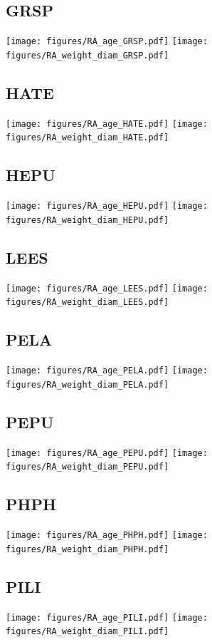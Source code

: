 \documentclass[10pt]{book} %
\begin{document}
\clearpage
\newpage
\subsection{GRSP}
\texttt{[image: figures/RA\_age\_GRSP.pdf]}
\texttt{[image: figures/RA\_weight\_diam\_GRSP.pdf]}

\clearpage
\newpage
\subsection{HATE}
\texttt{[image: figures/RA\_age\_HATE.pdf]}
\texttt{[image: figures/RA\_weight\_diam\_HATE.pdf]}

\clearpage
\newpage
\subsection{HEPU}
\texttt{[image: figures/RA\_age\_HEPU.pdf]}
\texttt{[image: figures/RA\_weight\_diam\_HEPU.pdf]}

\clearpage
\newpage
\subsection{LEES}
\texttt{[image: figures/RA\_age\_LEES.pdf]}
\texttt{[image: figures/RA\_weight\_diam\_LEES.pdf]}

\clearpage
\newpage
\subsection{PELA}
\texttt{[image: figures/RA\_age\_PELA.pdf]}
\texttt{[image: figures/RA\_weight\_diam\_PELA.pdf]}

\clearpage
\newpage
\subsection{PEPU}
\texttt{[image: figures/RA\_age\_PEPU.pdf]}
\texttt{[image: figures/RA\_weight\_diam\_PEPU.pdf]}

\clearpage
\newpage
\subsection{PHPH}
\texttt{[image: figures/RA\_age\_PHPH.pdf]}
\texttt{[image: figures/RA\_weight\_diam\_PHPH.pdf]}

\clearpage
\newpage
\subsection{PILI}
\texttt{[image: figures/RA\_age\_PILI.pdf]}
\texttt{[image: figures/RA\_weight\_diam\_PILI.pdf]}
\end{document}
